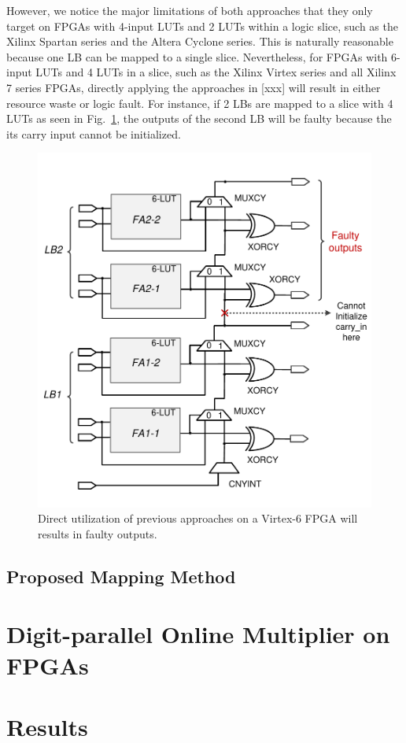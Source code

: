 \documentclass[conference]{IEEEtran}
\begin{document}
However, we notice the major limitations of both approaches that they only target on FPGAs with 4-input LUTs and 2 LUTs within a logic slice, such as the Xilinx Spartan series and the Altera Cyclone series. This is naturally reasonable because one LB can be mapped to a single slice. Nevertheless, for FPGAs with 6-input LUTs and 4 LUTs in a slice, such as the Xilinx Virtex series and all Xilinx 7 series FPGAs, directly applying the approaches in [xxx] will result in either resource waste or logic fault. For instance, if 2 LBs are mapped to a slice with 4 LUTs as seen in Fig.~\ref{Fig:PreviousWork}, the outputs of the second LB will be faulty because the its carry input cannot be initialized.

\begin{figure}
	\centering
	\includegraphics[width=.45\textwidth]{./Figures/SDadder_FastCarry_PreviousWork.pdf}
	\caption{Direct utilization of previous approaches on a Virtex-6 FPGA will results in faulty outputs.}
	\label{Fig:PreviousWork}
\end{figure}

\subsection{Proposed Mapping Method} 

\section{Digit-parallel Online Multiplier on FPGAs}

\section{Results}



\end{document}
